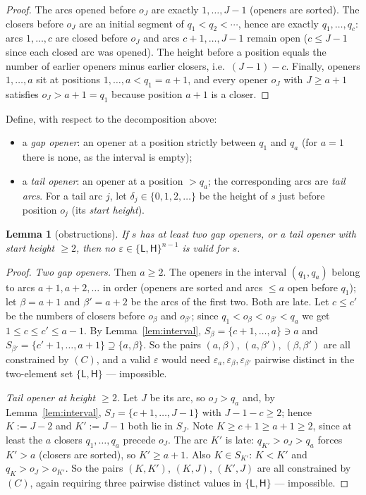 \documentclass[11pt]{article}
\newtheorem{lemma}[theorem]{Lemma}
\theoremstyle{definition}
\theoremstyle{remark}
\newcommand{\sL}{\mathsf{L}}
\newcommand{\sH}{\mathsf{H}}
\begin{document}
\begin{proof}
The arcs opened before $o_J$ are exactly $1,\dots,J-1$ (openers are
sorted). The closers before $o_J$ are an initial segment of
$q_1<q_2<\cdots$, hence are exactly $q_1,\dots,q_c$: arcs $1,\dots,c$ are
closed before $o_J$ and arcs $c+1,\dots,J-1$ remain open ($c\le J-1$ since
each closed arc was opened). The height before a position equals the number
of earlier openers minus earlier closers, i.e.\ $(J-1)-c$. Finally, openers
$1,\dots,a$ sit at positions $1,\dots,a<q_1=a+1$, and every opener $o_J$ with
$J\ge a+1$ satisfies $o_J>a+1=q_1$ because position $a+1$ is a closer.
\end{proof}

Define, with respect to the decomposition above:
\begin{itemize}
\item a \emph{gap opener}: an opener at a position strictly between $q_1$
  and $q_a$ (for $a=1$ there is none, as the interval is empty);
\item a \emph{tail opener}: an opener at a position $>q_a$; the
  corresponding arcs are \emph{tail arcs}. For a tail arc $j$, let
  $\delta_j\in\{0,1,2,\dots\}$ be the height of $s$ just before position
  $o_j$ (its \emph{start height}).
\end{itemize}

\begin{lemma}[obstructions]\label{lem:obstructions}
If $s$ has at least two gap openers, or a tail opener with start height
$\ge2$, then no $\varepsilon\in\{\sL,\sH\}^{n-1}$ is valid for $s$.
\end{lemma}

\begin{proof}
\emph{Two gap openers.} Then $a\ge2$. The openers in the interval
$(q_1,q_a)$ belong to arcs $a+1,a+2,\dots$ in order (openers are sorted and
arcs $\le a$ open before $q_1$); let $\beta=a+1$ and $\beta'=a+2$ be the
arcs of the first two. Both are late. Let $c\le c'$ be the numbers of
closers before $o_\beta$ and $o_{\beta'}$; since
$q_1<o_\beta<o_{\beta'}<q_a$ we get $1\le c\le c'\le a-1$. By
Lemma~\ref{lem:interval}, $S_\beta=\{c+1,\dots,a\}\ni a$ and
$S_{\beta'}=\{c'+1,\dots,a+1\}\supseteq\{a,\beta\}$. So the pairs
$(a,\beta)$, $(a,\beta')$, $(\beta,\beta')$ are all constrained by $(C)$,
and a valid $\varepsilon$ would need
$\varepsilon_a,\varepsilon_\beta,\varepsilon_{\beta'}$ pairwise distinct in
the two-element set $\{\sL,\sH\}$ --- impossible.

\emph{Tail opener at height $\ge2$.} Let $J$ be its arc, so $o_J>q_a$ and,
by Lemma~\ref{lem:interval}, $S_J=\{c+1,\dots,J-1\}$ with $J-1-c\ge2$;
hence $K:=J-2$ and $K':=J-1$ both lie in $S_J$. Note $K\ge c+1\ge a+1\ge2$,
since at least the $a$ closers $q_1,\dots,q_a$ precede $o_J$. The arc $K'$
is late: $q_{K'}>o_J>q_a$ forces $K'>a$ (closers are sorted), so
$K'\ge a+1$. Also $K\in S_{K'}$: $K<K'$ and $q_K>o_J>o_{K'}$. So the pairs
$(K,K')$, $(K,J)$, $(K',J)$ are all constrained by $(C)$, again requiring
three pairwise distinct values in $\{\sL,\sH\}$ --- impossible.
\end{proof}
\end{document}
